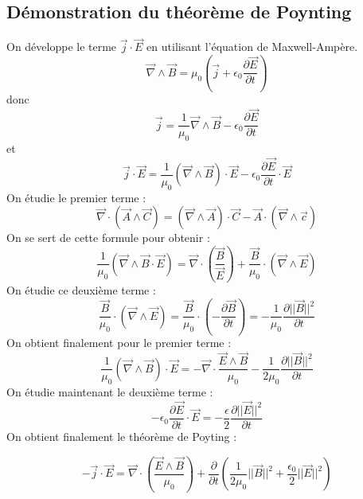 \documentclass[french]{yLectureNote}
\renewcommand{\vec}{\overrightarrow}
\newcommand{\norm}[1]{||\vec{#1}||}
\begin{document}
\subsection{Démonstration du théorème de Poynting}
On développe le terme $\vec{j}\cdot \vec{E}$ en utilisant l'équation de Maxwell-Ampère.
$$\vec{\nabla}\wedge \vec{B} = \mu_0(\vec{j}+\epsilon_0 \frac{\partial \vec{E}}{\partial t})$$
donc 
$$\vec{j} = \frac{1}{\mu_0}\vec{\nabla}\wedge \vec{B}-\epsilon_0 \frac{\partial \vec{E}}{\partial t}$$
et 
$$ \vec{j}\cdot \vec{E} = \frac{1}{\mu_0}(\vec{\nabla}\wedge \vec{B})\cdot \vec{E}-\epsilon_0 \frac{\partial \vec{E}}{\partial t}\cdot \vec{E}$$
On étudie le premier terme :
$$ \vec{\nabla}\cdot (\vec{A}\wedge \vec{C}) = (\vec{\nabla}\wedge \vec{A})\cdot \vec{C}-\vec{A}\cdot (\vec{\nabla}\wedge \vec{c})$$
On se sert de cette formule pour obtenir :
$$ \frac{1}{\mu_0}(\vec{\nabla}\wedge \vec{B}\cdot \vec{E}) = \vec{\nabla}\cdot (\frac{\vec{B}}{\vec{E}}) + \frac{\vec{B}}{\mu_0}\cdot (\vec{\nabla}\wedge \vec{E})$$
On étudie ce deuxième terme :
$$\frac{\vec{B}}{\mu_0}\cdot (\vec{\nabla}\wedge \vec{E}) = \frac{\vec{B}}{\mu_0}\cdot(-\frac{\partial \vec{B}}{\partial t}) = -\frac{1}{\mu_0}\frac{\partial \norm{B}^2}{\partial t}$$
On obtient finalement pour le premier terme :
$$\frac{1}{\mu_0}(\vec{\nabla}\wedge \vec{B})\cdot \vec{E} = -\vec{\nabla}\cdot \frac{\vec{E}\wedge \vec{B}}{\mu_0}-\frac{1}{2\mu_0}\frac{\partial \norm{B}^2}{\partial t}$$
On étudie maintenant le deuxième terme :
$$-\epsilon_0 \frac{\partial \vec{E}}{\partial t}\cdot \vec{E} = -\frac{\epsilon}{2}\frac{\partial \norm{E}^2}{\partial t}$$
On obtient finalement le théorème de Poyting :
\begin{theorem}
    $$-\vec{j}\cdot \vec{E} = \vec{\nabla}\cdot (\frac{\vec{E}\wedge \vec{B}}{\mu_0})+\frac{\partial}{\partial t}(\frac{1}{2\mu_0}\norm{B}^2 + \frac{\epsilon_0}{2}\norm{E}^2)$$
\end{theorem}
\end{document}
